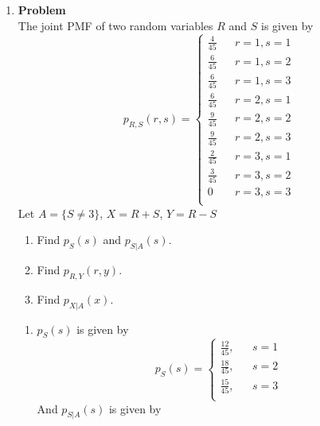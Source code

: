 \documentclass[12pt]{article}
\newenvironment{Ex}{\textbf{Problem}\vspace{.75em}\\}{}
\begin{document}
\begin{enumerate}
\begin{Ex}
\begin{solution}
\begin{enumerate}
      \end{enumerate}
    \end{solution}
  \end{Ex}
\item
  \begin{Ex}
    The joint PMF of two random variables $R$ and $S$ is given by
    \begin{equation*}
      \label{eq:3-question}
      p_{R,S}(r,s) = \left\{
        \begin{aligned}
          \frac{4}{45} && r=1, s=1 \\
          \frac{6}{45} && r=1, s=2 \\
          \frac{6}{45} && r=1, s=3 \\
          \frac{6}{45} && r=2, s=1 \\
          \frac{9}{45} && r=2, s=2 \\
          \frac{9}{45} && r=2, s=3 \\
          \frac{2}{45} && r=3, s=1 \\
          \frac{3}{45} && r=3, s=2 \\
          0 && r=3, s=3 \\
        \end{aligned} \right.
    \end{equation*}
    Let $A = \{S \not= 3\}$, $X = R+S$, $Y=R-S$
    \begin{enumerate}
    \item Find $p_S(s)$ and $p_{S|A}(s)$.
    \item Find $p_{R,Y}(r,y)$.
    \item Find $p_{X|A}(x)$.
    \end{enumerate}
    \begin{solution} \hfill
      \begin{enumerate}
      \item $p_S(s)$ is given by
        \begin{equation}
          \label{eq:3a-pmf-s}
          p_S(s) = \left\{
            \begin{aligned}
              \frac{12}{45}, && s=1 \\
              \frac{18}{45}, && s=2 \\
              \frac{15}{45}, && s=3 \\
            \end{aligned} \right.
        \end{equation}
        And $p_{S|A}(s)$ is given by
        \begin{equation}

\end{equation}
\end{enumerate}
\end{solution}
\end{Ex}
\end{enumerate}
\end{document}

